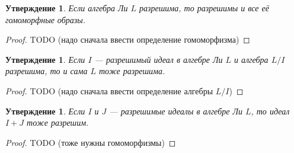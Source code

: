 \documentclass[a4paper, 12pt]{article}
\newtheorem{proposition}[theorem]{Утверждение}
\theoremstyle{definition}
\begin{document}
\begin{proposition}
    Если алгебра Ли \({ L }\) разрешима, то разрешимы и все её гомоморфные образы.
\end{proposition}
\begin{proof}
    TODO (надо сначала ввести определение гомоморфизма)
\end{proof}

\begin{proposition}
    Если \({ I }\) --- разрешимый идеал в алгебре Ли \({ L }\) и алгебра \({ L / I }\) разрешима, то и сама \({ L }\) тоже разрешима.
\end{proposition}
\begin{proof}
    TODO (надо сначала ввести определение алгебры \({ L / I }\))
\end{proof}

\begin{proposition}
    Если \({ I }\) и \({ J }\) --- разрешимые идеалы в алгебре Ли \({ L }\), то идеал \({ I + J }\) тоже разрешим.
\end{proposition}
\begin{proof}
    TODO (тоже нужны гомоморфизмы)
\end{proof}
\end{document}
